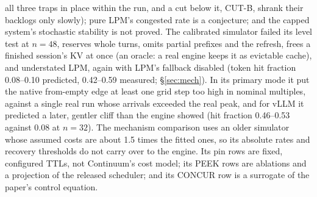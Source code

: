 all three traps in place within the run, and a cut below it, CUT-B, shrank their backlogs only slowly); pure LPM's congested rate is a conjecture; and the capped system's stochastic stability is not proved. The calibrated simulator failed its level test at $n=48$, reserves whole turns, omits partial prefixes and the refresh, frees a finished session's KV at once (an oracle: a real engine keeps it as evictable cache), and understated LPM, again with LPM's fallback disabled (token hit fraction 0.08--0.10 predicted, 0.42--0.59 measured; \S\ref{sec:mech}). In its primary mode it put the native from-empty edge at least one grid step too high in nominal multiples, against a single real run whose arrivals exceeded the real peak, and for vLLM it predicted a later, gentler cliff than the engine showed (hit fraction 0.46--0.53 against 0.08 at $n=32$). The mechanism comparison uses an older simulator whose assumed costs are about 1.5 times the fitted ones, so its absolute rates and recovery thresholds do not carry over to the engine. Its pin rows are fixed, configured TTLs, not Continuum's cost model; its PEEK rows are ablations and a projection of the released scheduler; and its CONCUR row is a surrogate of the paper's control equation.

